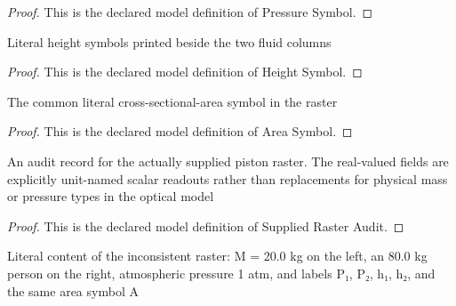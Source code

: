 \begin{proof}
  This is the declared model definition of Pressure Symbol.
\end{proof}
\begin{definition}
  \label{def:physics:phyx-mini-0477:phyxminiproblems-problemphyxmini0477-heightsymbol}
  Literal height symbols printed beside the two fluid columns
\end{definition}
\begin{proof}
  This is the declared model definition of Height Symbol.
\end{proof}
\begin{definition}
  \label{def:physics:phyx-mini-0477:phyxminiproblems-problemphyxmini0477-areasymbol}
  The common literal cross-sectional-area symbol in the raster
\end{definition}
\begin{proof}
  This is the declared model definition of Area Symbol.
\end{proof}
\begin{definition}
  \label{def:physics:phyx-mini-0477:phyxminiproblems-problemphyxmini0477-suppliedrasteraudit}
  An audit record for the actually supplied piston raster. The real-valued fields are explicitly unit-named scalar readouts rather than replacements for physical mass or pressure types in the optical model
\end{definition}
\begin{proof}
  This is the declared model definition of Supplied Raster Audit.
\end{proof}
\begin{definition}
  \label{def:physics:phyx-mini-0477:phyxminiproblems-problemphyxmini0477-recordsprovidedfiguremismatch}
  Literal content of the inconsistent raster: M = 20.0 kg on the left, an 80.0 kg person on the right, atmospheric pressure 1 atm, and labels P₁, P₂, h₁, h₂, and the same area symbol A
\end{definition}
